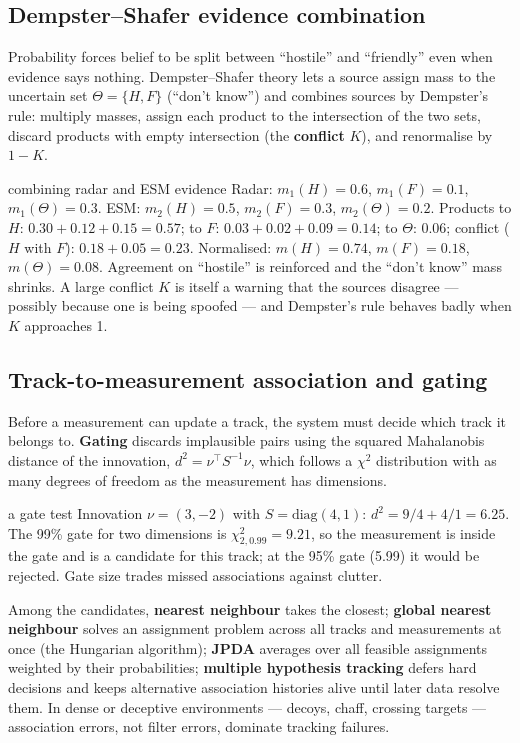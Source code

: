 \documentclass[11pt]{article}
\begin{document}
\subsection{Dempster--Shafer evidence combination}
Probability forces belief to be split between ``hostile'' and ``friendly'' even when evidence says nothing. Dempster--Shafer theory lets a source assign mass to the uncertain set $\Theta=\{H,F\}$ (``don't know'') and combines sources by Dempster's rule: multiply masses, assign each product to the intersection of the two sets, discard products with empty intersection (the \textbf{conflict} $K$), and renormalise by $1-K$.
\begin{example}{combining radar and ESM evidence}
Radar: $m_1(H)=0.6$, $m_1(F)=0.1$, $m_1(\Theta)=0.3$. ESM: $m_2(H)=0.5$, $m_2(F)=0.3$, $m_2(\Theta)=0.2$. Products to $H$: $0.30+0.12+0.15=0.57$; to $F$: $0.03+0.02+0.09=0.14$; to $\Theta$: $0.06$; conflict ($H$ with $F$): $0.18+0.05=0.23$. Normalised: $m(H)=0.74$, $m(F)=0.18$, $m(\Theta)=0.08$. Agreement on ``hostile'' is reinforced and the ``don't know'' mass shrinks. A large conflict $K$ is itself a warning that the sources disagree --- possibly because one is being spoofed --- and Dempster's rule behaves badly when $K$ approaches 1.
\end{example}

\subsection{Track-to-measurement association and gating}
\label{sec:gating}
Before a measurement can update a track, the system must decide which track it belongs to. \textbf{Gating} discards implausible pairs using the squared Mahalanobis distance of the innovation, $d^2=\nu^\top S^{-1}\nu$, which follows a $\chi^2$ distribution with as many degrees of freedom as the measurement has dimensions.
\begin{example}{a gate test}
Innovation $\nu=(3,-2)$ with $S=\text{diag}(4,1)$: $d^2=9/4+4/1=6.25$. The 99\% gate for two dimensions is $\chi^2_{2,0.99}=9.21$, so the measurement is inside the gate and is a candidate for this track; at the 95\% gate (5.99) it would be rejected. Gate size trades missed associations against clutter.
\end{example}
Among the candidates, \textbf{nearest neighbour} takes the closest; \textbf{global nearest neighbour} solves an assignment problem across all tracks and measurements at once (the Hungarian algorithm); \textbf{JPDA} averages over all feasible assignments weighted by their probabilities; \textbf{multiple hypothesis tracking} defers hard decisions and keeps alternative association histories alive until later data resolve them. In dense or deceptive environments --- decoys, chaff, crossing targets --- association errors, not filter errors, dominate tracking failures.
\end{document}
